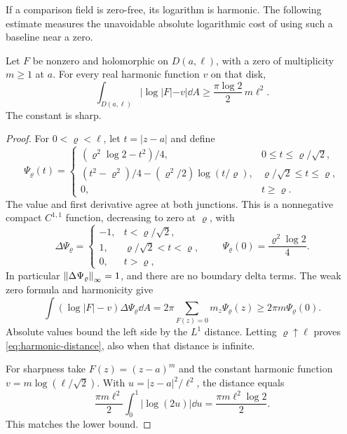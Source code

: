 If a comparison field is zero-free, its logarithm is harmonic.
The following estimate measures the unavoidable absolute
logarithmic cost of using such a baseline near a zero.

\begin{theorem}\label{thm:harmonic-distance}
Let $F$ be nonzero and holomorphic on $D(a,\ell)$, with a zero
of multiplicity $m\ge1$ at $a$. For every real harmonic function
$v$ on that disk,
\begin{equation}\label{eq:harmonic-distance}
 \int_{D(a,\ell)}|\log|F|-v|\dd A
 \ge\frac{\pi\log2}{2}\,m\ell^2 .
\end{equation}
The constant is sharp.
\end{theorem}
\begin{proof}
For $0<\varrho<\ell$, let $t=|z-a|$ and define
\[
 \Psi_\varrho(t)=
 \begin{cases}
 (\varrho^2\log2-t^2)/4,
                      &0\le t\le\varrho/\sqrt2,\\[2pt]
 (t^2-\varrho^2)/4-(\varrho^2/2)\log(t/\varrho),
                      &\varrho/\sqrt2\le t\le\varrho,\\[2pt]
 0,                   &t\ge\varrho.
 \end{cases}
\]
The value and first derivative agree at both junctions.
This is a nonnegative compact $C^{1,1}$ function, decreasing to
zero at $\varrho$, with
\[
 \Delta\Psi_\varrho=
 \begin{cases}-1,&t<\varrho/\sqrt2,\\
                1,&\varrho/\sqrt2<t<\varrho,\\
                0,&t>\varrho,\end{cases}
 \qquad
 \Psi_\varrho(0)=\frac{\varrho^2\log2}{4}.
\]
In particular $\left\|\Delta\Psi_\varrho\right\|_\infty=1$, and there
are no boundary delta terms. The weak zero formula and harmonicity
give
\[
 \int(\log|F|-v)\Delta\Psi_\varrho\dd A
 =2\pi\sum_{F(z)=0}m_z\Psi_\varrho(z)
 \ge2\pi m\Psi_\varrho(0).
\]
Absolute values bound the left side by the $L^1$ distance.
Letting $\varrho\uparrow\ell$ proves
\eqref{eq:harmonic-distance}, also when that distance is infinite.

For sharpness take $F(z)=(z-a)^m$ and the constant harmonic
function $v=m\log(\ell/\sqrt2)$. With $u=|z-a|^2/\ell^2$,
the distance equals
\[
 \frac{\pi m\ell^2}{2}\int_0^1|\log(2u)|\dd u
 =\frac{\pi m\ell^2\log2}{2}.
\]
This matches the lower bound.
\end{proof}


